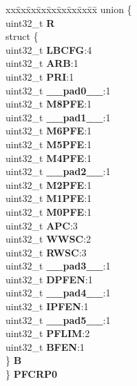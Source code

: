 \begin{DoxyCompactItemize}
\begin{tabbing}
\end{tabbing}\item 
\mbox{\label{structFLASH__tag_a88598f6b10f900be328c08d6fa00eafd}} 
\begin{tabbing}
xx\=xx\=xx\=xx\=xx\=xx\=xx\=xx\=xx\=\kill
union \{\\
\>uint32\_t {\bfseries R}\\
\>struct \{\\
\>\>uint32\_t {\bfseries LBCFG}:4\\
\>\>uint32\_t {\bfseries ARB}:1\\
\>\>uint32\_t {\bfseries PRI}:1\\
\>\>uint32\_t {\bfseries \_\_pad0\_\_}:1\\
\>\>uint32\_t {\bfseries M8PFE}:1\\
\>\>uint32\_t {\bfseries \_\_pad1\_\_}:1\\
\>\>uint32\_t {\bfseries M6PFE}:1\\
\>\>uint32\_t {\bfseries M5PFE}:1\\
\>\>uint32\_t {\bfseries M4PFE}:1\\
\>\>uint32\_t {\bfseries \_\_pad2\_\_}:1\\
\>\>uint32\_t {\bfseries M2PFE}:1\\
\>\>uint32\_t {\bfseries M1PFE}:1\\
\>\>uint32\_t {\bfseries M0PFE}:1\\
\>\>uint32\_t {\bfseries APC}:3\\
\>\>uint32\_t {\bfseries WWSC}:2\\
\>\>uint32\_t {\bfseries RWSC}:3\\
\>\>uint32\_t {\bfseries \_\_pad3\_\_}:1\\
\>\>uint32\_t {\bfseries DPFEN}:1\\
\>\>uint32\_t {\bfseries \_\_pad4\_\_}:1\\
\>\>uint32\_t {\bfseries IPFEN}:1\\
\>\>uint32\_t {\bfseries \_\_pad5\_\_}:1\\
\>\>uint32\_t {\bfseries PFLIM}:2\\
\>\>uint32\_t {\bfseries BFEN}:1\\
\>\} {\bfseries B}\\
\} {\bfseries PFCRP0}\\


\end{tabbing}
\end{DoxyCompactItemize}
